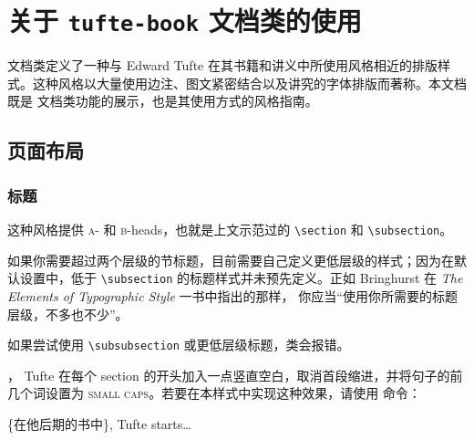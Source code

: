 

\chapter[关于 tufte-book 文档类的使用]{关于 \texttt{tufte-book} 文档类的使用}
\label{ch:tufte-book}

\TL 文档类定义了一种与 Edward Tufte 在其书籍和讲义中所使用风格相近的排版样式。这种风格以大量使用边注、图文紧密结合以及讲究的字体排版而著称。本文档既是 \TL 文档类功能的展示，也是其使用方式的风格指南。

\section{页面布局}\label{sec:page-layout}
\subsection{标题}\label{sec:headings}
这种风格提供 \textsc{a}- 和 \textsc{b}-heads，也就是上文示范过的 \Verb|\section| 和 \Verb|\subsection|。

如果你需要超过两个层级的节标题，目前需要自己定义更低层级的样式；因为在默认设置中，低于 \Verb|\subsection| 的标题样式并未预先定义。正如 Bringhurst 在 \textit{The Elements of Typographic Style} 一书中指出的那样，\cite{Bringhurst2005} 你应当“使用你所需要的标题层级，不多也不少”。

如果尝试使用 \Verb|\subsubsection| 或更低层级标题，\TL 类会报错。

，\cite{Tufte2006} Tufte 在每个 section 的开头加入一点竖直空白，取消首段缩进，并将句子的前几个词设置为 \textsc{small caps}。若要在本样式中实现这种效果，请使用  命令：
\begin{docspec}
  \{在他后期的书中\}, Tufte starts\ldots
\end{docspec}


